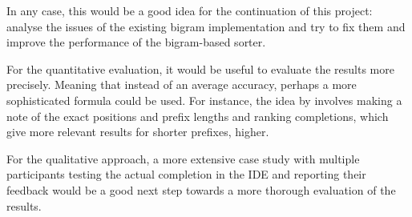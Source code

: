 \documentclass[sigplan,screen]{acmart}
\begin{document}
In any case, this would be a good idea for the continuation of this project: analyse the issues of the existing bigram implementation and try to fix them and improve the performance of the bigram-based sorter. 

For the quantitative evaluation, it would be useful to evaluate the results more precisely. Meaning that instead of an average accuracy, perhaps a more sophisticated formula could be used. For instance, the idea by \cite{Robb08a} involves making a note of the exact positions and prefix lengths and ranking completions, which give more relevant results for shorter prefixes, higher.

For the qualitative approach, a more extensive case study with multiple participants testing the actual completion in the IDE and reporting their feedback would be a good next step towards a more thorough evaluation of the results.



\end{document}
